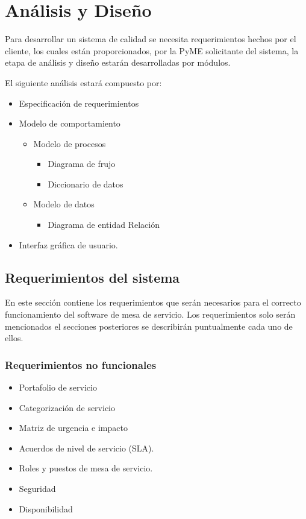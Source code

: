 \chapter{Análisis y Diseño}
Para desarrollar un sistema de calidad se necesita requerimientos hechos por el cliente, los cuales están proporcionados, por la PyME solicitante del sistema, la etapa de análisis y diseño estarán desarrolladas por módulos. 

El siguiente análisis estará compuesto por:

\begin{itemize}
	\item Especificación de requerimientos 
	\item 	Modelo de comportamiento
	\begin{itemize}
		\item Modelo de procesos 
		\begin{itemize}
			\item	Diagrama de frujo 
			\item 	Diccionario de datos 
		\end{itemize}
	\item Modelo de datos
	\begin{itemize}
		\item Diagrama de entidad Relación
	\end{itemize}
	
	\end{itemize}
	
		\item Interfaz gráfica de usuario.
\end{itemize}





    \section{Requerimientos  del sistema}
    
   En este sección  contiene los requerimientos que serán necesarios para el correcto funcionamiento del software de mesa de servicio. 
   Los requerimientos solo serán mencionados el secciones posteriores se describirán puntualmente cada uno de ellos.

\subsection{Requerimientos no funcionales }


\begin{itemize}
	\item Portafolio de servicio
	\item Categorización de servicio 
	\item Matriz de urgencia e impacto 
	\item Acuerdos de nivel de servicio (SLA).
	\item Roles y puestos de mesa de servicio.
	\item Seguridad
	\item Disponibilidad
	
\end{itemize}

